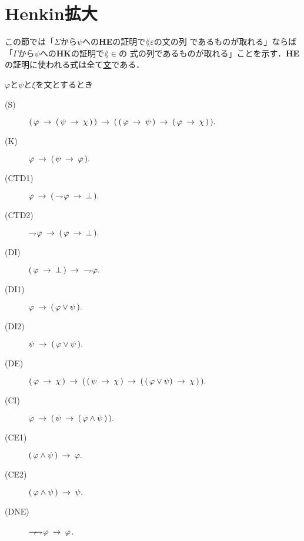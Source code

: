 \section{Henkin拡大}
\label{sec:Henkin_expansion}
	この節では「$\Sigma$から$\psi$への{\bf HE}の証明で$\lang{\varepsilon}$の文の列
	であるものが取れる」ならば「$\Gamma$から$\psi$への{\bf HK}の証明で$\lang{\in}$の
	式の列であるものが取れる」ことを示す．{\bf HE}の証明に使われる式は全て\underline{文}である．
	
	\begin{screen}
		\begin{logicalaxm}
			$\varphi$と$\psi$と$\xi$を文とするとき
			\begin{description}
				\item[(S)] $(\, \varphi \rarrow (\, \psi \rarrow \chi\, )\, ) 
					\rarrow (\, (\, \varphi \rarrow \psi\, )
					\rarrow (\, \varphi \rarrow \chi\, )\, ).$
				\item[(K)] $\varphi \rarrow (\, \psi \rarrow \varphi\, ).$
				\item[(CTD1)] $\varphi \rarrow (\, \negation \varphi \rarrow \bot\, ).$
				\item[(CTD2)] $\negation \varphi \rarrow (\, \varphi \rarrow \bot\, ).$
				\item[(DI)] $(\, \varphi \rarrow \bot\, ) \rarrow\ \negation \varphi.$
				\item[(DI1)] $\varphi \rarrow (\, \varphi \vee \psi\, ).$
				\item[(DI2)] $\psi \rarrow (\, \varphi \vee \psi\, ).$
				\item[(DE)] $(\, \varphi \rarrow \chi\, ) \rarrow 
					(\, (\, \psi \rarrow \chi\, ) 
					\rarrow (\, (\, \varphi \vee \psi) \rarrow \chi\, )\, ).$
				\item[(CI)] $\varphi \rarrow (\, \psi \rarrow (\, \varphi \wedge \psi\, )\, ).$
				\item[(CE1)] $(\, \varphi \wedge \psi\, ) \rarrow \varphi.$
				\item[(CE2)] $(\, \varphi \wedge \psi\, ) \rarrow \psi.$
				\item[(DNE)] $\negation \negation \varphi \rarrow \varphi$.
			\end{description}
		\end{logicalaxm}
	\end{screen}
	
